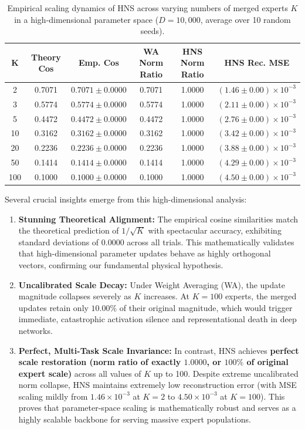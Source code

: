 \documentclass{article}
\theoremstyle{plain}
\theoremstyle{definition}
\theoremstyle{remark}
\begin{document}
\begin{table}[h]
  \caption{Empirical scaling dynamics of HNS across varying numbers of merged experts $K$ in a high-dimensional parameter space ($D = 10,000$, average over 10 random seeds).}
  \label{tab:large_k_scaling}
  \centering
  \footnotesize
  \begin{tabular}{cccccc}
    \toprule
    \textbf{K} & \textbf{Theory Cos} & \textbf{Emp. Cos} & \textbf{WA Norm Ratio} & \textbf{HNS Norm Ratio} & \textbf{HNS Rec. MSE} \\
    \midrule
    2   & 0.7071 & $0.7071 \pm 0.0000$ & 0.7071 & 1.0000 & $(1.46 \pm 0.00) \times 10^{-3}$ \\
    3   & 0.5774 & $0.5774 \pm 0.0000$ & 0.5774 & 1.0000 & $(2.11 \pm 0.00) \times 10^{-3}$ \\
    5   & 0.4472 & $0.4472 \pm 0.0000$ & 0.4472 & 1.0000 & $(2.76 \pm 0.00) \times 10^{-3}$ \\
    10  & 0.3162 & $0.3162 \pm 0.0000$ & 0.3162 & 1.0000 & $(3.42 \pm 0.00) \times 10^{-3}$ \\
    20  & 0.2236 & $0.2236 \pm 0.0000$ & 0.2236 & 1.0000 & $(3.88 \pm 0.00) \times 10^{-3}$ \\
    50  & 0.1414 & $0.1414 \pm 0.0000$ & 0.1414 & 1.0000 & $(4.29 \pm 0.00) \times 10^{-3}$ \\
    100 & 0.1000 & $0.1000 \pm 0.0000$ & 0.1000 & 1.0000 & $(4.50 \pm 0.00) \times 10^{-3}$ \\
    \bottomrule
  \end{tabular}
\end{table}

Several crucial insights emerge from this high-dimensional analysis:
\begin{enumerate}
  \item \textbf{Stunning Theoretical Alignment:} The empirical cosine similarities match the theoretical prediction of $1/\sqrt{K}$ with spectacular accuracy, exhibiting standard deviations of $0.0000$ across all trials. This mathematically validates that high-dimensional parameter updates behave as highly orthogonal vectors, confirming our fundamental physical hypothesis.
  \item \textbf{Uncalibrated Scale Decay:} Under Weight Averaging (WA), the update magnitude collapses severely as $K$ increases. At $K = 100$ experts, the merged updates retain only $10.00\%$ of their original magnitude, which would trigger immediate, catastrophic activation silence and representational death in deep networks.
  \item \textbf{Perfect, Multi-Task Scale Invariance:} In contrast, HNS achieves \textbf{perfect scale restoration (norm ratio of exactly $1.0000$, or $100\%$ of original expert scale)} across all values of $K$ up to 100. Despite extreme uncalibrated norm collapse, HNS maintains extremely low reconstruction error (with MSE scaling mildly from $1.46 \times 10^{-3}$ at $K=2$ to $4.50 \times 10^{-3}$ at $K=100$). This proves that parameter-space scaling is mathematically robust and serves as a highly scalable backbone for serving massive expert populations.
\end{enumerate}
\end{document}

